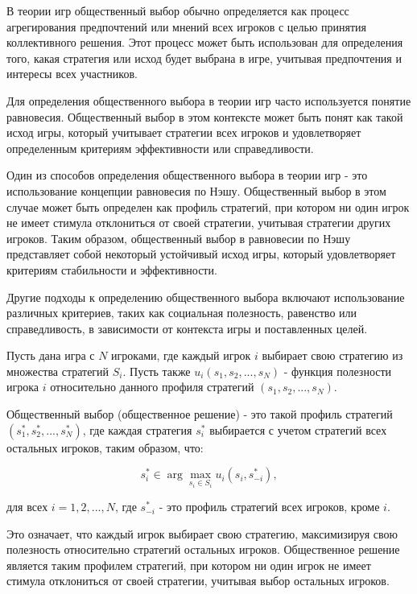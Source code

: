 


В теории игр общественный выбор обычно определяется как процесс агрегирования предпочтений или мнений всех игроков с целью принятия коллективного решения. Этот процесс может быть использован для определения того, какая стратегия или исход будет выбрана в игре, учитывая предпочтения и интересы всех участников.

Для определения общественного выбора в теории игр часто используется понятие равновесия. Общественный выбор в этом контексте может быть понят как такой исход игры, который учитывает стратегии всех игроков и удовлетворяет определенным критериям эффективности или справедливости.

Один из способов определения общественного выбора в теории игр - это использование концепции равновесия по Нэшу. Общественный выбор в этом случае может быть определен как профиль стратегий, при котором ни один игрок не имеет стимула отклониться от своей стратегии, учитывая стратегии других игроков. Таким образом, общественный выбор в равновесии по Нэшу представляет собой некоторый устойчивый исход игры, который удовлетворяет критериям стабильности и эффективности.

Другие подходы к определению общественного выбора включают использование различных критериев, таких как социальная полезность, равенство или справедливость, в зависимости от контекста игры и поставленных целей.


Пусть дана игра с \(N\) игроками, где каждый игрок \(i\) выбирает свою стратегию из множества стратегий \(S_i\). Пусть также \(u_i(s_1, s_2, ..., s_N)\) - функция полезности игрока \(i\) относительно данного профиля стратегий \((s_1, s_2, ..., s_N)\).

Общественный выбор (общественное решение) - это такой профиль стратегий \((s_1^*, s_2^*, ..., s_N^*)\), где каждая стратегия \(s_i^*\) выбирается с учетом стратегий всех остальных игроков, таким образом, что:

\[ s_i^* \in \arg\max_{s_i \in S_i} u_i(s_i, s_{-i}^*), \]

для всех \(i = 1, 2, ..., N\), где \(s_{-i}^*\) - это профиль стратегий всех игроков, кроме \(i\).

Это означает, что каждый игрок выбирает свою стратегию, максимизируя свою полезность относительно стратегий остальных игроков. Общественное решение является таким профилем стратегий, при котором ни один игрок не имеет стимула отклониться от своей стратегии, учитывая выбор остальных игроков.
